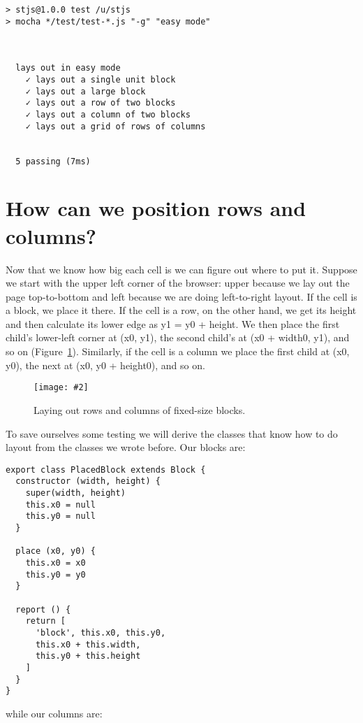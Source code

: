 \documentclass[krantzl]{krantz}
\newcommand{\figpdf}[4]{\begin{figure}%
\centering%
\texttt{[image: \#2]}%
\caption{#3}%
\label{#1}%
\end{figure}}
\newcommand{\figref}[1]{Figure~\ref{#1}}
\begin{document}
\begin{lstlisting}[frame=tblr,backgroundcolor=\color{black!5}]
> stjs@1.0.0 test /u/stjs
> mocha */test/test-*.js "-g" "easy mode"



  lays out in easy mode
    ✓ lays out a single unit block
    ✓ lays out a large block
    ✓ lays out a row of two blocks
    ✓ lays out a column of two blocks
    ✓ lays out a grid of rows of columns


  5 passing (7ms)
\end{lstlisting}


\section{How can we position rows and columns?}\label{layout-engine-position}


Now that we know how big each cell is
we can figure out where to put it.
Suppose we start with the upper left corner of the browser:
upper because we lay out the page top-to-bottom
and left because we are doing left-to-right layout.
If the cell is a block, we place it there.
If the cell is a row, on the other hand,
we get its height
and then calculate its lower edge as y1 = y0 + height.
We then place the first child’s lower-left corner at (x0, y1),
the second child’s at (x0 + width0, y1), and so on
(\figref{layout-engine-layout}).
Similarly,
if the cell is a column
we place the first child at (x0, y0),
the next at (x0, y0 + height0),
and so on.

\figpdf{layout-engine-layout}{./layout-engine/layout.pdf}{Laying out rows and columns of fixed-size blocks.}{0.6}


To save ourselves some testing we will derive the classes that know how to do layout
from the classes we wrote before.
Our blocks are:


\begin{lstlisting}[frame=tblr]
export class PlacedBlock extends Block {
  constructor (width, height) {
    super(width, height)
    this.x0 = null
    this.y0 = null
  }

  place (x0, y0) {
    this.x0 = x0
    this.y0 = y0
  }

  report () {
    return [
      'block', this.x0, this.y0,
      this.x0 + this.width,
      this.y0 + this.height
    ]
  }
}
\end{lstlisting}



\noindent while our columns are:
\end{document}
